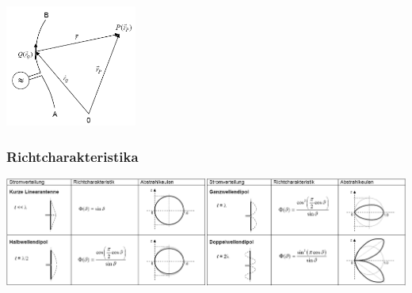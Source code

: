 		\begin{minipage}{4.5cm}
			\includegraphics[height=4cm]{./bilder/LinAnt_Strahlung.png}
        \end{minipage}
		
	\subsubsection{Richtcharakteristika}
	\begin{center}
		\includegraphics[width=19cm]{./bilder/LinAnt_Richtcharakteristika.png}    
  \end{center}

